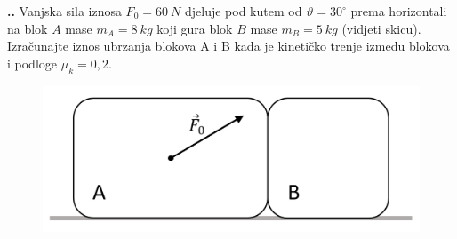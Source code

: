

\noindent 
\textbf{
\thecjelina.\thezadatak.}
Vanjska sila iznosa $F_0=60\ N$ djeluje pod kutem od $\vartheta = 30^\circ$ prema horizontali na blok $A$ mase $m_A=8 \ kg$ koji gura blok 
$B$ mase $m_B=5\ kg$ (vidjeti skicu). Izračunajte iznos ubrzanja blokova A i B kada je kinetičko trenje između blokova i podloge $\mu _k=0,2$.
\begin{figure}[h]%
  \begin{center}
    \includegraphics[scale=0.15]{../03_Dinamika_materijalne_tocke/Zadatak_D318.png}
  \end{center}
\end{figure}

